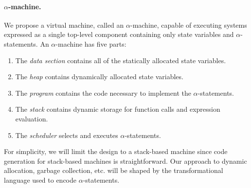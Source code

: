 


\paragraph{$\alpha$-machine.}
We propose a virtual machine, called an $\alpha$-machine, capable of executing systems expressed as a single top-level component containing only state variables and $\alpha$-statements.
An $\alpha$-machine has five parts:
\begin{enumerate}
\item The \emph{data section} contains all of the statically allocated state variables.
\item The \emph{heap} contains dynamically allocated state variables.
\item The \emph{program} contains the code necessary to implement the $\alpha$-statements.
\item The \emph{stack} contains dynamic storage for function calls and expression evaluation.
\item The \emph{scheduler} selects and executes $\alpha$-statements.
\end{enumerate}
For simplicity, we will limit the design to a stack-based machine since code generation for stack-based machines is straightforward.
Our approach to dynamic allocation, garbage collection, etc. will be shaped by the transformational language used to encode $\alpha$-statements.


